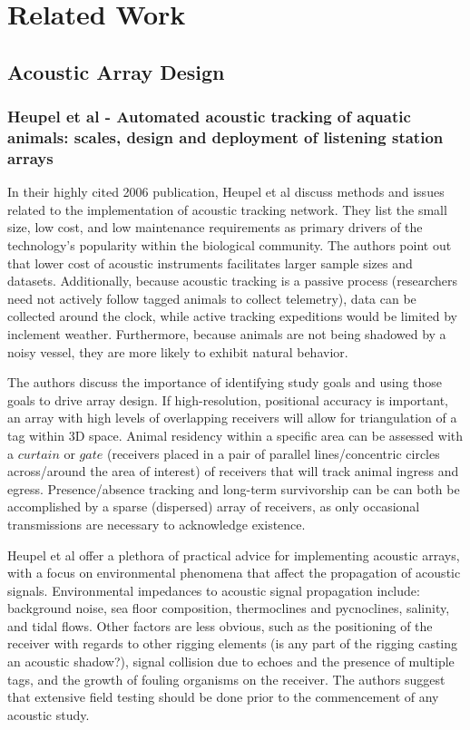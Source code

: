 \chapter{Related Work}

\section{Acoustic Array Design}
\subsection{Heupel et al - Automated acoustic tracking of aquatic animals: scales, design and deployment of listening station arrays}
In their highly cited 2006 publication\cite{Heupel2006}, Heupel et al discuss methods and issues related to the implementation of acoustic tracking network.  They list the small size, low cost, and low maintenance requirements as primary drivers of the technology's popularity within the biological community.  The authors point out that lower cost of acoustic instruments facilitates larger sample sizes and datasets.  Additionally, because acoustic tracking is a passive process (researchers need not actively follow tagged animals to collect telemetry), data can be collected around the clock, while active tracking expeditions would be limited by inclement weather.  Furthermore, because animals are not being shadowed by a noisy vessel, they are more likely to exhibit natural behavior.

The authors discuss the importance of identifying study goals and using those goals to drive array design.  If high-resolution, positional accuracy is important, an array with high levels of overlapping receivers will allow for triangulation of a tag within 3D space.  Animal residency within a specific area can be assessed with a $curtain$ or $gate$ (receivers placed in a pair of parallel lines/concentric circles across/around the area of interest) of receivers that will track animal ingress and egress.  Presence/absence tracking and long-term survivorship can be can both be accomplished by a sparse (dispersed) array of receivers, as only occasional transmissions are necessary to acknowledge existence.

Heupel et al offer a plethora of practical advice for implementing acoustic arrays, with a focus on environmental phenomena that affect the propagation of acoustic signals.  Environmental impedances to acoustic signal propagation include: background noise, sea floor composition, thermoclines and pycnoclines, salinity, and tidal flows.  Other factors are less obvious, such as the positioning of the receiver with regards to other rigging elements (is any part of the rigging casting an acoustic shadow?), signal collision due to echoes and the presence of multiple tags, and the growth of fouling organisms on the receiver.  The authors suggest that extensive field testing should be done prior to the commencement of any acoustic study.

